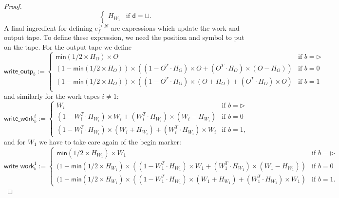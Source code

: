 \begin{proof}
$$\begin{cases}
        H_{W_1} & \text{if $\mathsf{d}=\sqcup$}. 	
    \end{cases}
    $$
    A final ingredient for defining $e_f^{\geq N}$ are expressions which update the work and output tape.
    To define these expression, we need the position and symbol to put on the tape. For the output tape we define
    $$
    \mathsf{write\_outp}_b:=\begin{cases}
    \mathsf{min}(1/2\times H_O)\times O & \text{if $b=\rhd$}\\
    (1-\mathsf{min}(1/2\times H_O))\times\left((1-O^T\cdot H_O)\times O + (O^T\cdot H_O)\times (O-H_O)\right) &\text{if $b=0$}\\
    (1-\mathsf{min}(1/2\times H_O))\times\left((1-O^T\cdot H_O)\times (O+H_O) + (O^T\cdot H_O)\times O\right) &\text{if $b=1$}\\
    \end{cases}
    $$
    and similarly for the work tapes $i\neq 1$:
    $$
    \mathsf{write\_work}_b^i:=\begin{cases}
    W_i & \text{if $b=\rhd$}\\
    (1-W_i^T\cdot H_{W_i})\times W_i + (W_i^T\cdot H_{W_i})\times (W_i-H_{W_i}) &\text{if $b=0$}\\
    (1-W_i^T\cdot H_{W_i})\times (W_i+H_{W_i}) + (W_i^T\cdot H_{W_i})\times W_i &\text{if $b=1$},
    \end{cases}
    $$
    and for  $W_1$ we have to take care again of the begin marker:
    $$
    \mathsf{write\_work}_b^1:=\begin{cases}
    \mathsf{min}(1/2\times H_{W_1})\times W_1 & \text{if $b=\rhd$}\\
    (1-\mathsf{min}(1/2\times H_{W_1})\times\left((1-W_1^T\cdot H_{W_1})\times W_1 + (W_1^T\cdot H_{W_1})\times (W_1-H_{W_1})\right) &\text{if $b=0$}\\
    (1-\mathsf{min}(1/2\times H_{W_1})\times\left((1-W_1^T\cdot H_{W_1})\times (W_1+H_{W_1}) + (W_1^T\cdot H_{W_1})\times W_1\right) &\text{if $b=1$}.
    \end{cases}
    $$



\end{proof}
